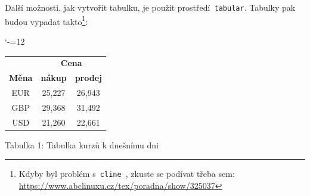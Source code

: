 \documentclass[a4paper, 11pt]{article}
\begin{document}
Další možnosti, jak vytvořit tabulku, je použít prostředí\texttt{ tabular}. Tabulky pak budou vypadat takto\footnote{Kdyby byl problém s\texttt{ cline }, zkuste se podívat třeba sem: \url{https://www.abclinuxu.cz/tex/poradna/show/325037}}:\\

\begin{center}\catcode`-=12
\begin{tabular}{|c|c|c|} \hline
	\multicolumn{1}{|c|}{} 	& \multicolumn{2}{|c|}{\bf Cena}	\\ \cline{2-3}
	\bf Měna			& \bf nákup 	& \bf prodej			\\ \hline
	EUR 				& 25,227 	& 26,943			\\ 
	GBP 				& 29,368 	& 31,492			\\ 
	USD 				& 21,260 	& 22,661			\\ \hline
\end{tabular}
\bigskip

Tabulka 1: Tabulka kurzů k dnešnímu dni
\bigskip\bigskip


\end{center}
\end{document}
